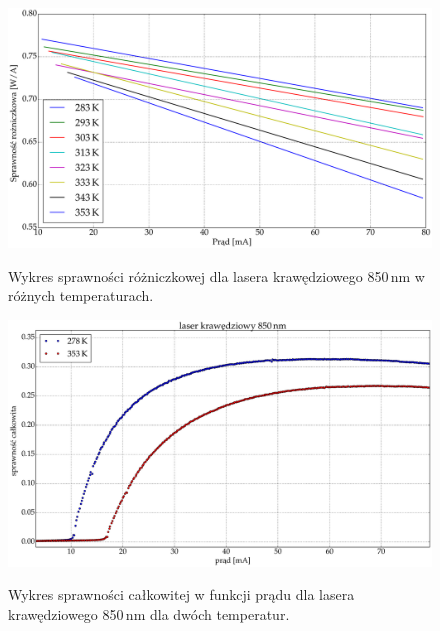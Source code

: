 \begin{figure}
\center
  \includegraphics[scale=0.25]{plot_edge_850/plot_eff_via_current_all.eps}
  \label{rys1}
  \caption{Wykres sprawności różniczkowej dla lasera krawędziowego 850\,nm w różnych temperaturach.}
  \label{fig:plot_eff_via_current_all_850}
\end{figure}
\begin{figure}
\center
  \includegraphics[scale=0.25]{plot_edge_850/plot_wall_eff.eps}
  \label{rys1}
  \caption{Wykres sprawności całkowitej w funkcji prądu dla lasera krawędziowego 850\,nm dla dwóch temperatur.}
  \label{fig:plot_wall_eff_850}
\end{figure}
\newpage